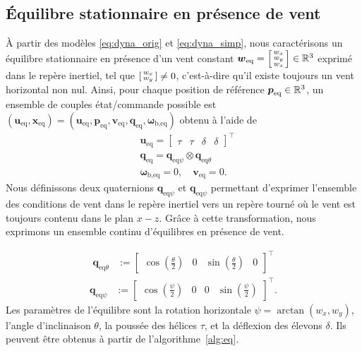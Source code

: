     \subsection{Équilibre stationnaire en présence de vent}
    À partir des modèles \eqref{eq:dyna_orig} et \eqref{eq:dyna_simp}, nous caractérisons un équilibre stationnaire en présence d'un vent constant $\boldsymbol{w}_{\mathrm{eq}} =\left[ \begin{smallmatrix}w_x \\ w_y \\w_z \end{smallmatrix} \right] \in {\mathbb R}^3$ exprimé dans le repère inertiel, tel que $\left[ \begin{smallmatrix}w_x \\ w_y \end{smallmatrix} \right] \neq 0$, c'est-à-dire qu'il existe toujours un vent horizontal non nul.
    Ainsi, pour chaque position de référence $\boldsymbol{p}_{\text{eq}} \in {\mathbb R}^3$, un ensemble de couples état/commande possible est $(\boldsymbol{u}_{\text{eq}}, \boldsymbol{x}_{\text{eq}}) = (\boldsymbol{u}_{\text{eq}}, \boldsymbol{p}_{\text{eq}}, \boldsymbol{v}_{\text{eq}}, \boldsymbol{q}_{\text{eq}}, \boldsymbol{\omega}_{\text{b},\text{eq}})$
    obtenu à l'aide de
    \begin{subequations}
    \label{eq:equilibrium}
    \begin{align}
    \label{eq:ueq}
            &\boldsymbol{u}_{\text{eq}} = \begin{bmatrix} \tau & \tau & \delta & \delta \end{bmatrix}^\top\\
            & \boldsymbol{q}_{\text{eq}} = \boldsymbol{q}_{\mathrm{eq}\psi} \otimes  \boldsymbol{q}_{\mathrm{eq}\theta} \label{eq:qeq}\\
            &\boldsymbol{\omega}_{\text{b},\text{eq}} = 0 , \quad \boldsymbol{v}_{\text{eq}} = 0.
    \end{align}
    \end{subequations}
    Nous définissons deux quaternions $\boldsymbol{q}_{\mathrm{eq}\psi}$ et $\boldsymbol{q}_{\mathrm{eq}\psi}$ permettant d'exprimer l'ensemble des conditions de vent dans le repère inertiel vers un repère tourné où le vent est toujours contenu dans le plan $x-z$. Grâce à cette transformation, nous exprimons un ensemble continu d'équilibres en présence de vent. 

    \begin{align}
    \label{eq:qtheta}
        \boldsymbol{q}_{\mathrm{eq}\theta} &:= \begin{bmatrix} \cos(\frac{\theta}{2}) & 0 & \sin(\frac{\theta}{2}) & 0 \end{bmatrix}^\top
    \end{align}
    \begin{align}
    \label{eq:qpsi}
        \boldsymbol{q}_{\mathrm{eq}\psi} &:= \begin{bmatrix} \cos(\frac{\psi}{2}) & 0 & 0 & \sin(\frac{\psi}{2}) \end{bmatrix}^\top.
    \end{align}
    Les paramètres de l'équilibre sont la rotation horizontale $\psi = \arctan(w_{x}, w_{y})$, l'angle d'inclinaison $\theta$, la poussée des hélices $\tau$, et la déflexion des élevons $\delta$. Ils peuvent être obtenus à partir de l'algorithme~\ref{alg:eq}. 

